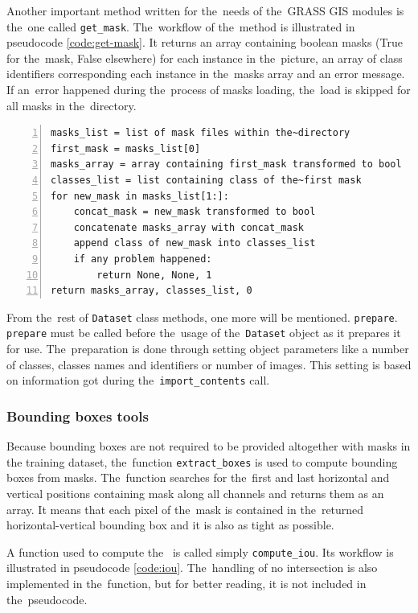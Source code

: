 Another important method written for the~needs of the~GRASS GIS modules is
the~one called \verb|get_mask|. The~workflow of the~method is illustrated in 
pseudocode \ref{code:get-mask}. It returns an array containing boolean masks 
(True for the~mask, False elsewhere) for each instance in the~picture, an array 
of class identifiers corresponding each instance in the~masks array and an error 
message. If an~error happened during the~process of masks loading, the~load is 
skipped for all masks in the~directory.

{\scriptsize
\begin{lstlisting}[style=python, caption={get\_mask}, captionpos=b, 
label=code:get-mask, deletekeywords={class},
backgroundcolor = \color{light-gray}, numbers=left, breaklines=true]
masks_list = list of mask files within the~directory
first_mask = masks_list[0]
masks_array = array containing first_mask transformed to bool
classes_list = list containing class of the~first mask
for new_mask in masks_list[1:]:
    concat_mask = new_mask transformed to bool
    concatenate masks_array with concat_mask
    append class of new_mask into classes_list
    if any problem happened:
        return None, None, 1
return masks_array, classes_list, 0
\end{lstlisting}}

From the~rest of \verb|Dataset| class methods, one more will be mentioned. 
\verb|prepare|. \verb|prepare| must be called before the~usage of
the~\verb|Dataset| object as it prepares it for use. The~preparation is done through 
setting object parameters like a number of classes, classes names and identifiers 
or number of images. This setting is based on information got during
the~\verb|import_contents| call.

\subsubsection{Bounding boxes tools}
\label{bbox-funcs}

Because bounding boxes are not required to be provided altogether with masks in 
the training dataset, the~function \verb|extract_boxes| is used to compute 
bounding boxes from masks. The~function searches for the~first and last 
horizontal and vertical positions containing mask along all channels and returns 
them as an array. It means that each pixel of the~mask is contained in
the~returned horizontal-vertical bounding box and it is also as tight as possible.

A function used to compute the~ is called simply \verb|compute_iou|. Its 
workflow is illustrated in pseudocode \ref{code:iou}. The~handling of no 
intersection is also implemented in the~function, but for better reading, it is 
not included in the~pseudocode.


